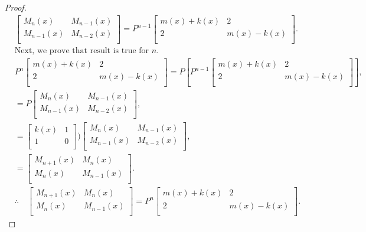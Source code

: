 \begin{proof}
\begin{align*}
&{
 \begin{bmatrix}
    M_{n}(x) & M_{n-1}(x) \\
    M_{n-1}(x) & M_{n-2}(x)\\
  \end{bmatrix}
}=P^{n-1}{
          \begin{bmatrix}
            m(x)+k(x) & 2 \\
            2 & m(x)-k(x) \\
          \end{bmatrix}
       }.\\				
&\text{Next, we prove that result is true for $n$.}\\
&P^{n}{
          \begin{bmatrix}
            m(x)+k(x) & 2 \\
            2 & m(x)-k(x) \\
          \end{bmatrix}
      }=P\left[ P^{n-1}{
          \begin{bmatrix}
            m(x)+k(x) & 2 \\
            2 & m(x)-k(x) \\
          \end{bmatrix}
      }\right], \\										
	&=P{
 \begin{bmatrix}
    M_{n}(x) & M_{n-1}(x) \\
    M_{n-1}(x) & M_{n-2}(x) \\
  \end{bmatrix}
},\\
&={
 \begin{bmatrix}
    k(x) & 1 \\
    1 & 0 \\
  \end{bmatrix}
)}{
 \begin{bmatrix}
    M_{n}(x) & M_{n-1}(x) \\
    M_{n-1}(x) & M_{n-2}(x) \\
  \end{bmatrix}
},\\					
&={
 \begin{bmatrix}
    M_{n+1}(x) & M_{n}(x)\\
    M_{n}(x) & M_{n-1}(x) \\
  \end{bmatrix}
}.\\
&\therefore \quad{
 \begin{bmatrix}
    M_{n+1}(x) & M_{n}(x) \\
    M_{n}(x) & M_{n-1}(x) \\
  \end{bmatrix}
}=P^n{\begin{bmatrix}
            m(x)+k(x) & 2 \\
            2 & m(x)-k(x)\\
          \end{bmatrix}
        }.
 \end{align*}	
 \end{proof}
